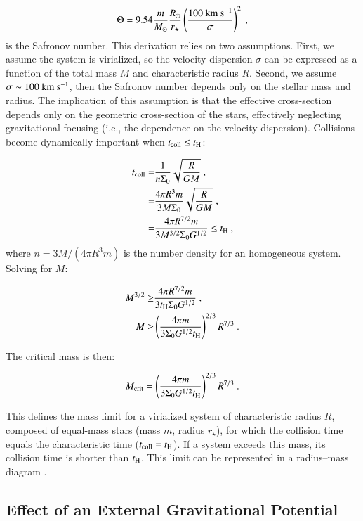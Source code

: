 \begin{appendixs}
	\begin{equation}
		\Theta = 9.54 \frac{m}{M_{\odot}} \frac{R_{\odot}}{r_{\star}} \left(\frac{100~{\rm km}~{\rm s}^{-1}}{\sigma}\right)^2~,
	\end{equation}
	is the Safronov number. This derivation relies on two assumptions. First, we assume the system is virialized, so the velocity dispersion $\sigma$ can be expressed as a function of the total mass $M$ and characteristic radius $R$. Second, we assume $\sigma \sim 100~{\rm km}~{\rm s}^{-1}$, then the Safronov number depends only on the stellar mass and radius. The implication of this assumption is that the effective cross-section depends only on the geometric cross-section of the stars, effectively neglecting gravitational focusing (i.e., the dependence on the velocity dispersion). Collisions become dynamically important when $t_{\rm coll} \leq t_{\rm H}$:
	
	\begin{align}
		t_{\rm coll} =& \frac{1}{n \Sigma_0}\sqrt{\frac{R}{GM}}~,\\
		=& \frac{4\pi R^3m}{3M \Sigma_0}\sqrt{\frac{R}{GM}}~,\\
		=& \frac{4\pi R^{7/2}m}{3M^{3/2} \Sigma_0 G^{1/2}} \leq t_{\rm H}~,
	\end{align}
	where $n=3M/(4\pi R^3m)$ is the number density for an homogeneous system. Solving for $M$:
	
	\begin{align}
		M^{3/2} \geq& \frac{4\pi R^{7/2}m}{3t_{\rm H} \Sigma_0 G^{1/2}} ~,\\
		M \geq& \left(\frac{4 \pi m}{3 \Sigma_0 G^{1/2} t_{\rm H}}\right)^{2/3}R^{7/3}~.
	\end{align}
	
	The critical mass is then:
	
	\begin{equation}
		M_{\rm crit} = \left(\frac{4 \pi m}{3 \Sigma_0 G^{1/2} t_{\rm H}}\right)^{2/3}R^{7/3}~.
	\end{equation}
	
	This defines the mass limit for a virialized system of characteristic radius $R$, composed of equal-mass stars (mass $m$, radius $r_{\star}$), for which the collision time equals the characteristic time ($t_{\rm coll} = t_{\rm H}$). If a system exceeds this mass, its collision time is shorter than $t_{\rm H}$. This limit can be represented in a radius–mass diagram \citep{escala2021observational,vergara2023global}.
	
	\subsection{Effect of an External Gravitational Potential}
	

\end{appendixs}
